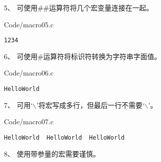 \begin{frame}[fragile]\ft{\secname}
5、 可使用{\tf \#\#}运算符将几个宏变量连接在一起。
\end{frame}

\begin{frame}[fragile]\ft{\secname}
{Code/macro05.c}
\pause
\begin{lstlisting}[backgroundcolor=\color{red!10}]
1234
\end{lstlisting}
\end{frame}

\begin{frame}[fragile]\ft{\secname}
6、 可使用{\tf \#}运算符将标识符转换为字符串字面值。
\end{frame}

\begin{frame}[fragile]\ft{\secname}
{Code/macro06.c}
\pause 
\begin{lstlisting}[backgroundcolor=\color{red!10}]
HelloWorld
\end{lstlisting}
\end{frame}

\begin{frame}[fragile]\ft{\secname}
7、 可用‘{$\backslash$}’将宏写成多行，但最后一行不需要‘{$\backslash$}’。
\end{frame}

\begin{frame}[fragile]\ft{\secname}

{Code/macro07.c}
\end{frame}

\begin{frame}[fragile]\ft{\secname}
\begin{lstlisting}[backgroundcolor=\color{red!10}]
HelloWorld  HelloWorld  HelloWorld
\end{lstlisting}
\end{frame}

\begin{frame}[fragile]\ft{\secname}
8、 使用带参量的宏需要谨慎。
\end{frame}

